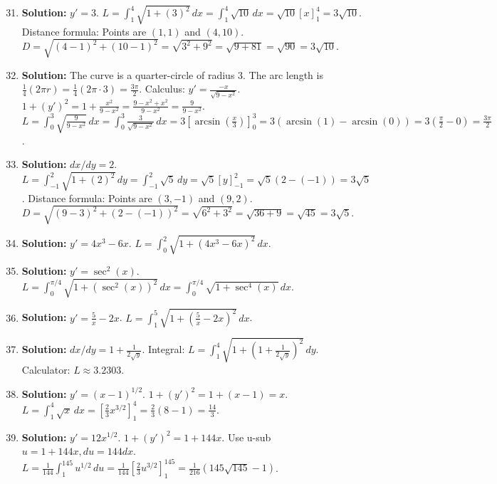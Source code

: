 \documentclass{article}
\begin{document}
\begin{enumerate}
    \setcounter{enumi}{30}
    \item \textbf{Solution:} $y' = 3$. $L = \int_1^4 \sqrt{1 + (3)^2} \,dx = \int_1^4 \sqrt{10} \,dx = \sqrt{10}[x]_1^4 = 3\sqrt{10}$.
    Distance formula: Points are $(1,1)$ and $(4,10)$. $D = \sqrt{(4-1)^2 + (10-1)^2} = \sqrt{3^2 + 9^2} = \sqrt{9+81} = \sqrt{90} = 3\sqrt{10}$.
    
    \item \textbf{Solution:} The curve is a quarter-circle of radius 3. The arc length is $\frac{1}{4}(2\pi r) = \frac{1}{4}(2\pi \cdot 3) = \frac{3\pi}{2}$.
    Calculus: $y' = \frac{-x}{\sqrt{9-x^2}}$. $1+(y')^2 = 1 + \frac{x^2}{9-x^2} = \frac{9-x^2+x^2}{9-x^2} = \frac{9}{9-x^2}$.
    $L = \int_0^3 \sqrt{\frac{9}{9-x^2}} \,dx = \int_0^3 \frac{3}{\sqrt{9-x^2}} \,dx = 3[\arcsin(\frac{x}{3})]_0^3 = 3(\arcsin(1) - \arcsin(0)) = 3(\frac{\pi}{2}-0) = \frac{3\pi}{2}$.

    \item \textbf{Solution:} $dx/dy = 2$. $L = \int_{-1}^2 \sqrt{1+(2)^2} \,dy = \int_{-1}^2 \sqrt{5} \,dy = \sqrt{5}[y]_{-1}^2 = \sqrt{5}(2 - (-1)) = 3\sqrt{5}$.
    Distance formula: Points are $(3,-1)$ and $(9,2)$. $D = \sqrt{(9-3)^2 + (2-(-1))^2} = \sqrt{6^2+3^2} = \sqrt{36+9} = \sqrt{45} = 3\sqrt{5}$.

    \item \textbf{Solution:} $y' = 4x^3 - 6x$. $L = \int_0^2 \sqrt{1 + (4x^3 - 6x)^2} \,dx$.
    
    \item \textbf{Solution:} $y' = \sec^2(x)$. $L = \int_0^{\pi/4} \sqrt{1 + (\sec^2(x))^2} \,dx = \int_0^{\pi/4} \sqrt{1 + \sec^4(x)} \,dx$.
    
    \item \textbf{Solution:} $y' = \frac{5}{x} - 2x$. $L = \int_1^5 \sqrt{1 + (\frac{5}{x} - 2x)^2} \,dx$.
    
    \item \textbf{Solution:} $dx/dy = 1 + \frac{1}{2\sqrt{y}}$. Integral: $L = \int_1^4 \sqrt{1 + (1 + \frac{1}{2\sqrt{y}})^2} \,dy$.
    Calculator: $L \approx 3.2303$.
    
    \item \textbf{Solution:} $y' = (x-1)^{1/2}$. $1+(y')^2 = 1 + (x-1) = x$. $L = \int_1^4 \sqrt{x} \,dx = [\frac{2}{3}x^{3/2}]_1^4 = \frac{2}{3}(8-1) = \frac{14}{3}$.
    
    \item \textbf{Solution:} $y' = 12x^{1/2}$. $1+(y')^2 = 1+144x$. Use u-sub $u=1+144x, du=144dx$.
    $L = \frac{1}{144}\int_1^{145} u^{1/2} \,du = \frac{1}{144}[\frac{2}{3}u^{3/2}]_1^{145} = \frac{1}{216}(145\sqrt{145} - 1)$.
    

\end{enumerate}
\end{document}
